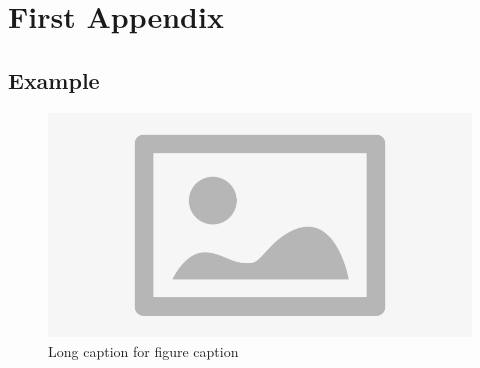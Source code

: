 \chapter{First Appendix}
\label{chap:appendix01}

\section{Example}

\begin{figure}[h!]
    \centering
    \includegraphics[width=\textwidth]{Chapters/Appendix/Media/placeholder.jpg}
    \caption[Short caption for list of figures]{Long caption for figure caption}
    \label{app:placeholder}
\end{figure}